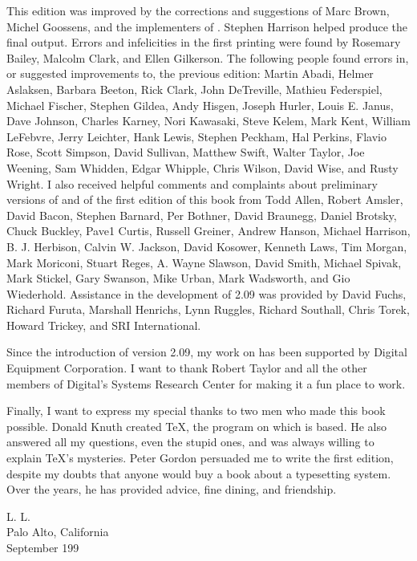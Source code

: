 This edition was improved by the corrections and suggestions of Marc Brown,
Michel Goossens, and the implementers of \ltxee{}. Stephen Harrison helped
produce the final output. Errors and infelicities in the first printing were found
by Rosemary Bailey, Malcolm Clark, and Ellen Gilkerson. The following people 
found errors in, or suggested improvements to, the previous edition: Martin
Abadi, Helmer Aslaksen, Barbara Beeton, Rick Clark, John DeTreville, Mathieu 
Federspiel, Michael Fischer, Stephen Gildea, Andy Hisgen, Joseph Hurler,
Louis E. Janus, Dave Johnson, Charles Karney, Nori Kawasaki, Steve Kelem,
Mark Kent, William LeFebvre, Jerry Leichter, Hank Lewis, Stephen Peckham,
Hal Perkins, Flavio Rose, Scott Simpson, David Sullivan, Matthew Swift, Walter
Taylor, Joe Weening, Sam Whidden, Edgar Whipple, Chris Wilson, David Wise,
and Rusty Wright. I also received helpful comments and complaints about preliminary 
versions of \ltx{} and of the first edition of this book from Todd Allen, Robert Amsler, David Bacon, 
Stephen Barnard, Per Bothner, David Braunegg, Daniel Brotsky, Chuck Buckley, Pave1 Curtis, Russell Greiner, Andrew Hanson,
Michael Harrison, B. J. Herbison, Calvin W. Jackson, David Kosower, Kenneth Laws, Tim Morgan, Mark Moriconi, 
Stuart Reges, A. Wayne Slawson, David Smith, Michael Spivak, Mark Stickel, Gary Swanson, Mike Urban, Mark
Wadsworth, and Gio Wiederhold. Assistance in the development of \ltx{}2.09 was provided by 
David Fuchs, Richard Furuta, Marshall Henrichs, Lynn Ruggles, Richard Southall, Chris Torek, 
Howard Trickey, and SRI International.


Since the introduction of version 2.09, my work on \ltx{} has been supported
by Digital Equipment Corporation. I want to thank Robert Taylor and all the
other members of Digital's Systems Research Center for making it a fun place
to work.

Finally, I want to express my special thanks to two men who made this book
possible. Donald Knuth created \TeX{}, the program on which \ltx{} is based. He
also answered all my questions, even the stupid ones, and was always willing to
explain \TeX{}'s mysteries. Peter Gordon persuaded me to write the first edition,
despite my doubts that anyone would buy a book about a typesetting system.
Over the years, he has provided advice, fine dining, and friendship.


\bigskip
{\hfill L. L.}\\
{Palo Alto, California\hfill}\\
{September 199\hfill}